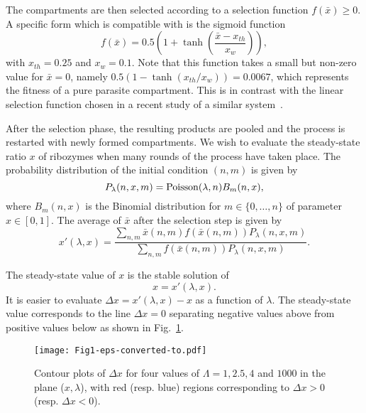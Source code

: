 \documentclass[twocolumn,showpacs,floatfix]{revtex4-1}
\newcommand{\xb}{{\bar x}}
\newcommand{\be}{\begin{equation}}
\newcommand{\ee}{\end{equation}}
\begin{document}
The compartments are then selected according to a selection
function $f(\xb) \ge 0$. 
A specific form which is compatible with \cite{Matsumura2016} 
is the sigmoid function  
\be
\label{selection_fct}
f(\xb)=0.5 \left(1+\tanh \left( \frac{\xb-x_{th}}{x_w} \right) \right),
\ee
with $x_{th}=0.25$ and $x_w=0.1$.
Note that this function takes a small but non-zero
value for $\xb=0$, namely $0.5 ( 1 - \tanh (x_{th}/x_{w}) )= 0.0067$, which
represents the fitness of a pure parasite compartment. This is in contrast with the linear selection function 
chosen in a recent study of a similar system~\cite{Zadorin2017}. 

After the selection phase, the resulting products are pooled and the process is restarted with newly formed compartments. We
wish to evaluate the steady-state ratio $x$ of ribozymes when many rounds of the process have
taken place. 
The probability distribution of the initial condition $(n, m)$ is given by
\be
\label{def_proba}
P_\lambda (n,x, m) = {\rm Poisson}(\lambda, n) B_m(n, x),
\ee
where $B_m(n,x)$ is the Binomial distribution for $m\in\{0,\ldots,n\}$ of parameter $x \in [0, 1]$. The average of $\xb$ after the selection step is given by
\be
\label{Recursion}
x'(\lambda,x)=\frac{\sum_{n,m} \xb(n,m) f(\xb(n,m)) P_\lambda(n,x,m)}{\sum_{n,m} f(\xb(n,m)) P_\lambda(n,x,m)}.
\ee

The steady-state value of $x$ is the stable solution of
\be
x=x'(\lambda,x). 
\ee
It is easier to evaluate
$\Delta x=x'(\lambda,x) -x$ as a function of $\lambda$. The steady-state value corresponds to the line $\Delta x = 0$
separating negative values above from positive values below as shown in Fig.~\ref{fig:L2}. 


\begin{figure}[htb]
\begin{center}
\texttt{[image: Fig1-eps-converted-to.pdf]}
\end{center}
\caption{Contour plots of $\Delta x$ for four values of $\Lambda=1,2.5,4$ and $1000$ 
in the plane ($x,\lambda$), with red (resp. blue) regions 
corresponding to $\Delta x > 0$ (resp. $\Delta x < 0$).} 
\label{fig:L2}
\end{figure}
\end{document}
